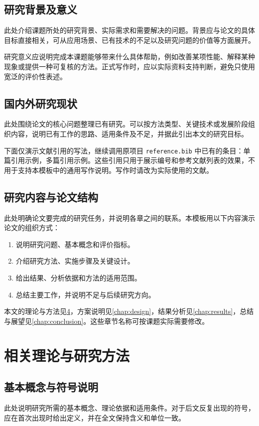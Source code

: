 \documentclass[bachelor]{njupthesis}
\begin{document}
\section{研究背景及意义}
此处介绍课题所处的研究背景、实际需求和需要解决的问题。背景应与论文的具体目标直接相关，可从应用场景、已有技术的不足以及研究问题的价值等方面展开。

研究意义应说明完成本课题能够带来什么具体帮助，例如改善某项性能、解释某种现象或提供一种可复核的方法。正式写作时，应以实际资料支持判断，避免只使用宽泛的评价性表述。

\section{国内外研究现状}
此处围绕论文的核心问题整理已有研究。可以按方法类型、关键技术或发展阶段组织内容，说明已有工作的思路、适用条件及不足，并据此引出本文的研究目标。

下面仅演示文献引用的写法，继续调用原项目 \texttt{reference.bib} 中已有的条目：单篇引用示例\cite{tang2015}，多篇引用示例\cite{wang2016,chen2019}。这些引用只用于展示编号和参考文献列表的效果，不用于支持本模板中的通用写作说明。写作时请改为实际使用的文献。

\section{研究内容与论文结构}
此处明确论文要完成的研究任务，并说明各章之间的联系。本模板用以下内容演示论文的组织方式：
\begin{enumerate}
  \item 说明研究问题、基本概念和评价指标。
  \item 介绍研究方法、实施步骤及关键设计。
  \item 给出结果、分析依据和方法的适用范围。
  \item 总结主要工作，并说明不足与后续研究方向。
\end{enumerate}

本文的理论与方法见\ref{chap:methods}，方案说明见\ref{chap:design}，结果分析见\ref{chap:results}，总结与展望见\ref{chap:conclusion}。这些章节名称可按课题实际需要修改。

\chapter{相关理论与研究方法}
\label{chap:methods}

\section{基本概念与符号说明}
此处说明研究所需的基本概念、理论依据和适用条件。对于后文反复出现的符号，应在首次出现时给出定义，并在全文保持含义和单位一致。
\end{document}
